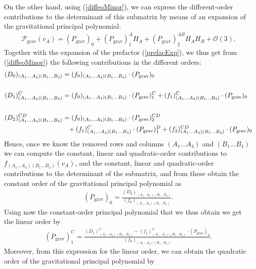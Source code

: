 On the other hand, using (\ref{diffeoMinor}), we can express the different-order contributions to the determinant of this submatrix by means of an expansion of the gravitational principal polynomial:
\begin{align}
    \mathcal{P}_{\text{grav}}(v_A) = (P_{\text{grav}})_{0} + (P_{\text{grav}})^A_1 H_A+ (P_{\text{grav}})^{AB}_2 H_A H_B +\mathcal{O}(3).
\end{align}
Together with the expansion of the prefactor (\ref{prefacExp}), we thus get from (\ref{diffeoMinor}) the following contributions in the different orders:
\begin{align}\label{minorPoly}
    \begin{aligned}
    (D_0)_{(A_1...A_4)(B_1...B_4)}  &= (f_0)_{(A_1...A_4)(B_1...B_4)} \cdot (P_{\text{grav}})_0 \\
    \\
    (D_1)^C_{(A_1...A_4)(B_1...B_4)}  &= (f_0)_{(A_1...A_4)(B_1...B_4)} \cdot (P_{\text{grav}})^C_1 + (f_1)^C_{(A_1...A_4)(B_1...B_4)} \cdot (P_{\text{grav}})_0  \\
    \\
    (D_2)^{CD}_{(A_1...A_4)(B_1...B_4)}  &=  (f_0)_{(A_1...A_4)(B_1...B_4)} \cdot (P_{\text{grav}})_2^{CD} \\
     & \hphantom{=} +
     (f_1)^C_{(A_1...A_4)(B_1...B_4)} \cdot (P_{\text{grav}})_1^D +(f_2)^{CD}_{(A_1...A_4)(B_1...B_4)} \cdot (P_{\text{grav}})_0 
    \end{aligned}
\end{align}
Hence, once we know the removed rows and columns $(A_1...A_4)$ and $(B_1...B_4)$ we can compute the constant, linear and quadratic-order contributions to $f_{(A_1...A_4)(B_1...B_4)}(v_A)$, and the constant, linear and quadratic-order contributions to the determinant of the submatrix, and from these obtain the constant order of the gravitational principal polynomial as
\begin{align}\label{POLY1}
(P_{\text{grav}})_0 = \frac{(D_0)_{(A_1...A_4)(B_1...B_4)}}{(f_0)_{(A_1...A_4)(B_1...B_4)}}.
\end{align}
Using now the constant-order principal polynomial that we thus obtain we get the linear order by
\begin{align}\label{POLY2}
    (P_{\text{grav}})^C_1= \frac{(D_1)^C_{(A_1...A_4)(B_1...B_4)} - (f_1)^C_{(A_1...A_4)(B_1...B_4)} \cdot (P_{\text{grav}})_0}{(f_0)_{(A_1...A_4)(B_1...B_4)}}.
\end{align}
Moreover, from this expression for the linear order, we can obtain the quadratic order of the gravitational principal polynomial by
